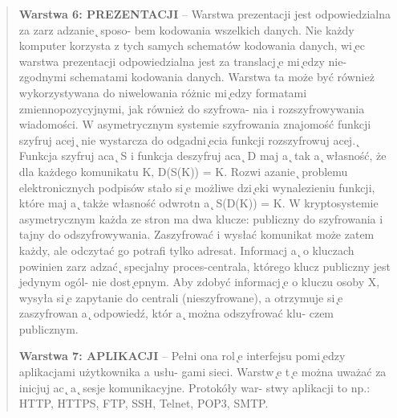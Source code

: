 \documentclass[a4paper,11pt]{article}
\begin{document}
\begin{verse}
\textbf{Warstwa 6: PREZENTACJI} – Warstwa prezentacji jest odpowiedzialna za zarz adzanie
̨
sposo-
bem kodowania wszelkich danych. Nie każdy komputer korzysta z tych samych schematów
kodowania danych, wi ̨ec warstwa prezentacji odpowiedzialna jest za translacj ̨e mi ̨edzy nie-
zgodnymi schematami kodowania danych. Warstwa ta może być również wykorzystywana
do niwelowania różnic mi ̨edzy formatami zmiennopozycyjnymi, jak również do szyfrowa-
nia i rozszyfrowywania wiadomości.
W asymetrycznym systemie szyfrowania znajomość funkcji szyfruj acej
̨ nie wystarcza do
odgadni ̨ecia funkcji rozszyfrowuj acej.
̨
Funkcja szyfruj aca
̨ S i funkcja deszyfruj aca
̨ D maj a  ̨
tak a  ̨ własność, że dla każdego komunikatu K, D(S(K)) = K. Rozwi azanie
̨
problemu
elektronicznych podpisów stało si ̨e możliwe dzi ̨eki wynalezieniu funkcji, które maj a  ̨ także
własność odwrotn a  ̨ S(D(K)) = K. W kryptosystemie asymetrycznym każda ze stron ma
dwa klucze: publiczny do szyfrowania i tajny do odszyfrowywania. Zaszyfrować i wysłać
komunikat może zatem każdy, ale odczytać go potrafi tylko adresat. Informacj a  ̨ o kluczach
powinien zarz adzać
̨
specjalny proces-centrala, którego klucz publiczny jest jedynym ogól-
nie dost ̨epnym. Aby zdobyć informacj ̨e o kluczu osoby X, wysyła si ̨e zapytanie do centrali
(nieszyfrowane), a otrzymuje si ̨e zaszyfrowan a  ̨ odpowiedź, któr a  ̨ można odszyfrować klu-
czem publicznym.

\textbf{Warstwa 7: APLIKACJI} – Pełni ona rol ̨e interfejsu pomi ̨edzy aplikacjami użytkownika a usłu-
gami sieci. Warstw ̨e t ̨e można uważać za inicjuj ac
̨ a  ̨ sesje komunikacyjne. Protokóły war-
stwy aplikacji to np.: HTTP, HTTPS, FTP, SSH, Telnet, POP3, SMTP.

\end{verse}
\end{document}
